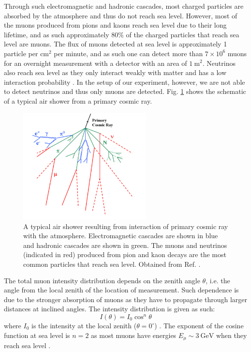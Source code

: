 \documentclass[a4paper]{report}
\numberwithin{equation}{section}
\begin{document}
Through such electromagnetic and hadronic cascades, most charged particles are absorbed by the atmosphere and thus do not reach sea level. However, most of the muons 
produced from pions and kaons reach sea level due to their long lifetime, and as such approximately 80\% of the charged particles that reach sea level are muons.
The flux of muons detected at sea level is approximately 1 particle per cm$^2$ per minute, and as such one can detect more than $7 \times 10^{6}$ muons for an 
overnight measurement with a detector with an area of $\SI{1}{\meter\squared}$.  Neutrinos also reach sea level as they only interact weakly with matter and has a 
low interaction probability \cite{Grupen2005}. In the setup of our experiment, however, we are not able to detect neutrinos and thus only muons are detected. 
Fig. \ref{fig:air_shower} shows the schematic of a typical air shower from a primary cosmic ray. \par 


\begin{figure}[!h]
	\centering
	\includegraphics[width=0.6\textwidth]{air_shower.png}
	\caption{A typical air shower resulting from interaction of primary cosmic ray with the atmosphere. Electromagnetic cascades are shown in blue and hadronic 
	cascades are shown in green. The muons and neutrinos (indicated in red) produced from pion and kaon decays are the most common particles that reach sea level.
	Obtained from Ref. \cite{Blanco2009}.}
	\label{fig:air_shower}	
\end{figure}

The total muon intensity distribution depends on the zenith angle $\theta$, i.e. the angle from the local zenith of the location of 
measurement. Such dependence is due to the stronger absorption of muons as they have to propagate through larger distances at 
inclined angles. The intensity distribution is given as such: 
\begin{equation}
    I(\theta) = I_0 \cos^n \theta 
	\label{eq:muon_intensity}
\end{equation}
where $I_0$ is the intensity at the local zenith ($\theta = 0^\circ$) \cite{Grupen2005}. The exponent of the cosine function at 
sea level is $n = 2$ as most muons have energies $E_\mu \sim \SI{3}{\giga\electronvolt}$ when they reach sea level \cite{Stefano2012}.
\end{document}
